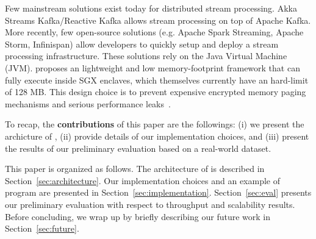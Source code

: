 Few mainstream solutions exist today for distributed stream processing.
Akka Streams Kafka/Reactive Kafka\cite{reactivekafka} allows stream processing on top of Apache Kafka\cite{apachekafka}.
More recently, few open-source solutions (e.g. Apache Spark Streaming\cite{apachesparkstreaming}, Apache Storm\cite{apachestorm}, Infinispan\cite{infinispan}) allow developers to quickly setup and deploy a stream processing infrastructure.
These solutions rely on the Java Virtual Machine (JVM)\cite{}.
\SYS proposes an lightweight and low memory-footprint framework that can fully execute inside SGX enclaves, which themselves currently have an hard-limit of 128 MB.
This design choice is to prevent expensive encrypted memory paging mechanisms and serious performance leaks~\cite{brenner_securekeeper:_2016}.

To recap, the \textbf{contributions} of this paper are the followings: (i) we present the archicture of \SYS, (ii) provide details of our implementation choices, and (iii) present the results of our preliminary evaluation based on a real-world dataset.

This paper is organized as follows.
The architecture of \SYS is described in Section~\ref{sec:architecture}.
Our implementation choices and an example of \SYS program are presented in Section~\ref{sec:implementation}.
Section~\ref{sec:eval} presents our preliminary evaluation with respect to throughput and scalability results.
Before concluding, we wrap up by briefly describing our future work in Section~\ref{sec:future}.

